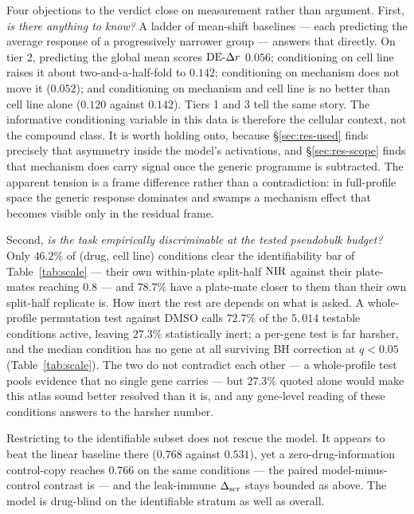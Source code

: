 Four objections to the verdict close on measurement rather than argument. First, \emph{is there
anything to know?} A ladder of mean-shift baselines --- each predicting the average response of a
progressively narrower group --- answers that directly. On tier 2, predicting the global mean scores
$\textrm{DE-}\Delta r$ $0.056$; conditioning on cell line raises it about two-and-a-half-fold to $0.142$;
conditioning on mechanism does not move it ($0.052$); and conditioning on mechanism and cell line is
no better than cell line alone ($0.120$ against $0.142$). Tiers 1 and 3 tell the same story. The
informative conditioning variable in this data is therefore the cellular context, not the compound
class. It is worth holding onto, because \S\ref{sec:res-used} finds precisely that asymmetry
inside the model's activations, and \S\ref{sec:res-scope} finds that mechanism does carry signal
once the generic programme is subtracted. The apparent tension is a frame difference rather than a
contradiction: in full-profile space the generic response dominates and swamps a mechanism effect
that becomes visible only in the residual frame.

Second, \emph{is the task empirically discriminable at the tested pseudobulk budget?} Only $46.2\%$
of (drug, cell line) conditions clear the identifiability bar of Table~\ref{tab:scale} --- their own
within-plate split-half $\textrm{NIR}$ against their plate-mates reaching $0.8$ --- and $78.7\%$ have a
plate-mate closer to them than their own split-half replicate is. How inert the rest are depends on
what is asked. A whole-profile permutation test against DMSO
calls $72.7\%$ of the $5{,}014$ testable conditions active, leaving $27.3\%$ statistically inert; a
per-gene test is far harsher, and the median condition has no gene at all surviving BH correction at
$q < 0.05$ (Table~\ref{tab:scale}). The two do not contradict each other --- a whole-profile test
pools evidence that no single gene carries --- but $27.3\%$ quoted alone would make this atlas sound
better resolved than it is, and any gene-level reading of these conditions answers to the harsher
number.

Restricting to the identifiable subset does not rescue the model. It appears to beat the linear
baseline there ($0.768$ against $0.531$), yet a zero-drug-information control-copy reaches $0.766$
on the same conditions --- the paired model-minus-control contrast is 
--- and the leak-immune $\Delta_{\textrm{scr}}$ stays bounded as above. The model is drug-blind on the identifiable
stratum as well as overall.

